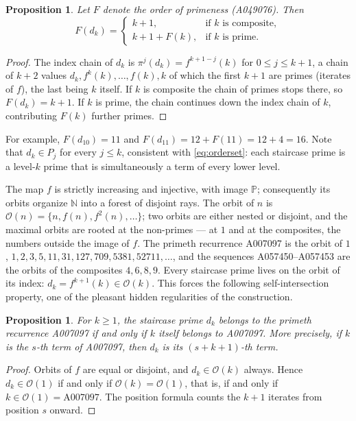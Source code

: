 \documentclass[11pt,a4paper]{article}
\theoremstyle{plain}
\newtheorem{proposition}[theorem]{Proposition}
\theoremstyle{definition}
\newcommand{\N}{\mathbb{N}}
\newcommand{\Pset}{\mathbb{P}}
\begin{document}
\begin{proposition}\label{prop:ladder}
Let $F$ denote the order of primeness (A049076). Then
\[
  F(d_k)=
  \begin{cases}
    k+1, & \text{if $k$ is composite},\\[2pt]
    k+1+F(k), & \text{if $k$ is prime}.
  \end{cases}
\]
\end{proposition}

\begin{proof}
The index chain of $d_k$ is
$\pi^{j}(d_k)=f^{k+1-j}(k)$ for $0\le j\le k+1$, a chain of $k+2$ values
$d_k,f^{k}(k),\ldots,f(k),k$ of which the first $k+1$ are primes (iterates
of $f$), the last being $k$ itself. If $k$ is composite the chain of primes
stops there, so $F(d_k)=k+1$. If $k$ is prime, the chain continues down the
index chain of $k$, contributing $F(k)$ further primes.
\end{proof}

For example, $F(d_{10})=11$ and $F(d_{11})=12+F(11)=12+4=16$. Note that
$d_k\in P_j$ for every $j\le k$, consistent with \eqref{eq:orderset}: each
staircase prime is a level-$k$ prime that is simultaneously a term of every
lower level.

The map $f$ is strictly increasing and injective, with image $\Pset$;
consequently its orbits organize $\N$ into a forest of disjoint rays. The
orbit of $n$ is $\mathcal{O}(n)=\{n,f(n),f^{2}(n),\ldots\}$; two orbits are
either nested or disjoint, and the maximal orbits are rooted at the
non-primes --- at $1$ and at the composites, the numbers outside the image
of $f$. The primeth recurrence A007097 is the orbit of $1$,
$1,2,3,5,11,31,127,709,5381,52711,\ldots$, and the sequences
A057450--A057453 are the orbits of the composites $4,6,8,9$. Every
staircase prime lives on the orbit of its index: $d_k=f^{k+1}(k)\in
\mathcal{O}(k)$. This forces the following self-intersection property, one
of the pleasant hidden regularities of the construction.

\begin{proposition}\label{prop:crossing}
For $k\ge1$, the staircase prime $d_k$ belongs to the primeth recurrence
A007097 if and only if $k$ itself belongs to A007097. More precisely, if $k$
is the $s$-th term of A007097, then $d_k$ is its $(s+k+1)$-th term.
\end{proposition}

\begin{proof}
Orbits of $f$ are equal or disjoint, and $d_k\in\mathcal{O}(k)$ always.
Hence $d_k\in\mathcal{O}(1)$ if and only if $\mathcal{O}(k)=\mathcal{O}(1)$,
that is, if and only if $k\in\mathcal{O}(1)=\mathrm{A007097}$. The position
formula counts the $k+1$ iterates from position $s$ onward.
\end{proof}
\end{document}
